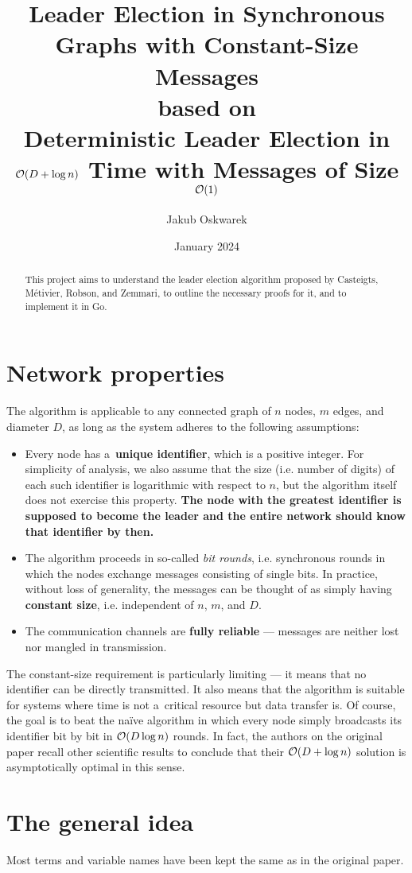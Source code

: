 \documentclass{article}
\title{%
    Leader Election in Synchronous Graphs with Constant-Size Messages\\%
    \normalsize based on\\%
    \large Deterministic Leader Election in \(\bigO\pars{D + \log n}\) Time with Messages of Size \(\bigO\pars{1}\)%
}
\author{Jakub Oskwarek}
\date{January 2024}
\DeclarePairedDelimiter{\parenthesesdelimiter}{(}{)}
\def\pars{\parenthesesdelimiter*}
\newcommand{\bigO}{\mathcal{O}}
\begin{document}
\maketitle
\begin{abstract}
This project aims to understand the leader election algorithm proposed by Casteigts, Métivier, Robson, and Zemmari, to outline the necessary proofs for it, and to implement it in Go.
\end{abstract}

\section{Network properties}
The algorithm \cite{Casteigts2016DeterministicLE} is applicable to any connected graph of \(n\) nodes, \(m\) edges, and diameter \(D\), as long as the system adheres to the following assumptions:
\begin{itemize}
    \item Every node has a~\textbf{unique identifier}, which is a positive integer. For simplicity of analysis, we also assume that the size (i.e. number of digits) of each such identifier is logarithmic with respect to \(n\), but the algorithm itself does not exercise this property. \textbf{The node with the greatest identifier is supposed to become the leader and the entire network should know that identifier by then.}
    \item The algorithm proceeds in so-called \emph{bit rounds}, i.e. synchronous rounds in which the nodes exchange messages consisting of single bits. In practice, without loss of generality, the messages can be thought of as simply having \textbf{constant size}, i.e. independent of \(n\), \(m\), and \(D\).
    \item The communication channels are \textbf{fully reliable} --- messages are neither lost nor mangled in transmission.
\end{itemize}
The constant-size requirement is particularly limiting --- it means that no identifier can be directly transmitted. It also means that the algorithm is suitable for systems where time is not a~critical resource but data transfer is. Of course, the goal is to beat the naïve algorithm in which every node simply broadcasts its identifier bit by bit in \(\bigO\pars{D\log n}\) rounds. In fact, the authors on the original paper recall other scientific results to conclude that their \(\bigO\pars{D + \log n}\) solution is asymptotically optimal in this sense.

\section{The general idea}
Most terms and variable names have been kept the same as in the original paper.
\end{document}
